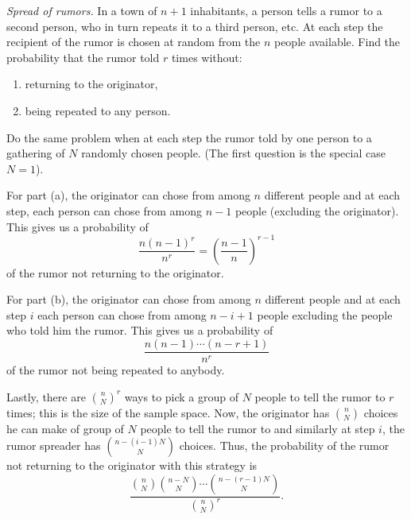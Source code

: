 \begin{problem}[Handout 2, \# 13]
  \emph{Spread of rumors.} In a town of \(n+1\) inhabitants, a person tells
  a rumor to a second person, who in turn repeats it to a third person,
  etc. At each step the recipient of the rumor is chosen at random from the
  \(n\) people available. Find the probability that the rumor told \(r\)
  times without:
  \begin{enumerate}[label=(\alph*),noitemsep]
  \item returning to the originator,
  \item being repeated to any person.
  \end{enumerate}
  Do the same problem when at each step the rumor told by one person to a
  gathering of \(N\) randomly chosen people. (The first question is the
  special case \(N=1\)).
\end{problem}
\begin{solution}
  For part (a), the originator can chose from among \(n\) different people
  and at each step, each person can chose from among \(n-1\) people
  (excluding the originator). This gives us a probability of
  \[
    \frac{n(n-1)^r}{n^r}=\left(\frac{n-1}{n}\right)^{r-1}
  \]
  of the rumor not returning to the originator.

  For part (b), the originator can chose from among \(n\) different people
  and at each step \(i\) each person can chose from among \(n-i+1\) people
  excluding the people who told him the rumor. This gives us a probability
  of
  \[
    \frac{n(n-1)\dotsm(n-r+1)}{n^r}
  \]
  of the rumor not being repeated to anybody.

  Lastly, there are \(\displaystyle\binom{n}{N}^r\) ways to pick a group of
  \(N\) people to tell the rumor to \(r\) times; this is the size of the
  sample space. Now, the originator has \(\displaystyle\binom{n}{N}\)
  choices he can make of group of \(N\) people to tell the rumor to and
  similarly at step \(i\), the rumor spreader has
  \(\displaystyle\binom{n-(i-1)N}{N}\) choices. Thus, the probability of
  the rumor not returning to the originator with this strategy is
  \[
    \frac{\displaystyle\binom{n}{N}\binom{n-N}{N}\dotsm\binom{n-(r-1)N}{N}}
    {\displaystyle\binom{n}{N}^r}.
  \]
\end{solution}
\newpage

